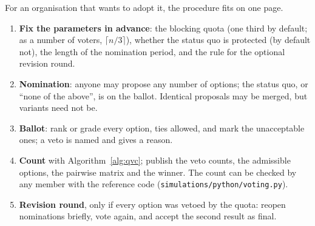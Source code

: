 For an organisation that wants to adopt it, the procedure fits on one page.
\begin{enumerate}
  \item \textbf{Fix the parameters in advance}: the blocking quota (one third by default; as a number of
  voters, $\lceil n/3 \rceil$), whether the status quo is protected (by default not), the length of the
  nomination period, and the rule for the optional revision round.
  \item \textbf{Nomination}: anyone may propose any number of options; the status quo, or ``none of the
  above'', is on the ballot. Identical proposals may be merged, but variants need not be.
  \item \textbf{Ballot}: rank or grade every option, ties allowed, and mark the unacceptable ones; a veto
  is named and gives a reason.
  \item \textbf{Count} with Algorithm~\ref{alg:qvc}; publish the veto counts, the admissible options, the
  pairwise matrix and the winner. The count can be checked by any member with the reference code
  (\texttt{simulations/python/voting.py}).
  \item \textbf{Revision round}, only if every option was vetoed by the quota: reopen nominations briefly,
  vote again, and accept the second result as final.
\end{enumerate}
